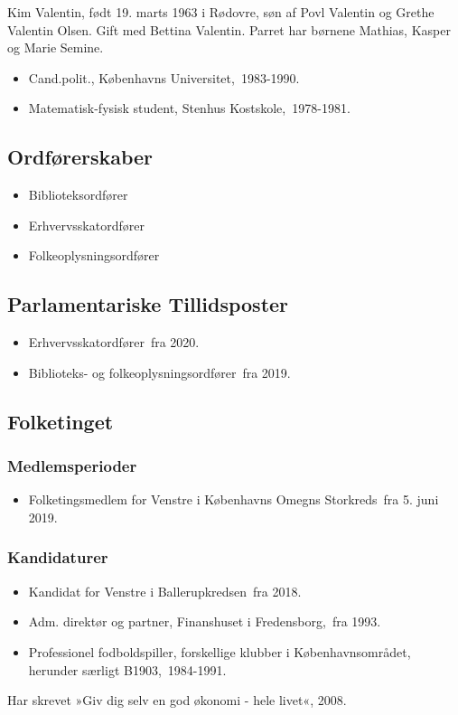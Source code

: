 \documentclass[11pt, a4paper]{awesome-cv}
\begin{document}
\makecvheader[R]
\makelettertitle
\begin{cvletter}
Kim Valentin, født 19. marts 1963 i Rødovre, søn af Povl Valentin og Grethe Valentin Olsen. Gift med Bettina Valentin. Parret har børnene Mathias, Kasper og Marie Semine.

\begin{itemize}
\item Cand.polit., Københavns Universitet, 1983-1990.
\item Matematisk-fysisk student, Stenhus Kostskole, 1978-1981.
\end{itemize}
\subsection*{Ordførerskaber}
\begin{itemize}
\item Biblioteksordfører
\item Erhvervsskatordfører
\item Folkeoplysningsordfører
\end{itemize}
\subsection*{Parlamentariske Tillidsposter}
\begin{itemize}
\item Erhvervsskatordfører fra 2020.
\item Biblioteks- og folkeoplysningsordfører fra 2019.
\end{itemize}
\subsection*{Folketinget}
\subsubsection*{Medlemsperioder}
\begin{itemize}
\item Folketingsmedlem for Venstre i Københavns Omegns Storkreds fra 5. juni 2019.
\end{itemize}
\subsubsection*{Kandidaturer}
\begin{itemize}
\item Kandidat for Venstre i Ballerupkredsen fra 2018.
\end{itemize}
\begin{itemize}
\item Adm. direktør og partner, Finanshuset i Fredensborg, fra 1993.
\item Professionel fodboldspiller, forskellige klubber i Københavnsområdet, herunder særligt B1903, 1984-1991.
\end{itemize}
Har skrevet »Giv dig selv en god økonomi - hele livet«, 2008.

\end{cvletter}
\end{document}
